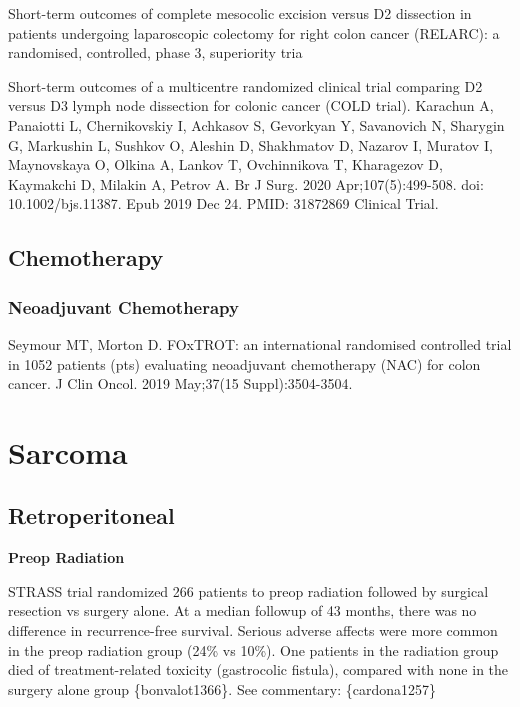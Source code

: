 \documentclass[
]{book}
\begin{document}
Short-term outcomes of complete mesocolic excision versus D2 dissection in patients undergoing laparoscopic colectomy for right colon cancer (RELARC): a randomised, controlled, phase 3, superiority tria

Short-term outcomes of a multicentre randomized clinical trial comparing D2 versus D3 lymph node dissection for colonic cancer (COLD trial).
Karachun A, Panaiotti L, Chernikovskiy I, Achkasov S, Gevorkyan Y, Savanovich N, Sharygin G, Markushin L, Sushkov O, Aleshin D, Shakhmatov D, Nazarov I, Muratov I, Maynovskaya O, Olkina A, Lankov T, Ovchinnikova T, Kharagezov D, Kaymakchi D, Milakin A, Petrov A.
Br J Surg. 2020 Apr;107(5):499-508. doi: 10.1002/bjs.11387. Epub 2019 Dec 24.
PMID: 31872869 Clinical Trial.

\hypertarget{chemotherapy}{%
\chapter{Chemotherapy}\label{chemotherapy}}

\hypertarget{neoadjuvant-chemotherapy}{%
\section{Neoadjuvant Chemotherapy}\label{neoadjuvant-chemotherapy}}

Seymour MT, Morton D. FOxTROT: an international randomised controlled trial in 1052 patients (pts) evaluating neoadjuvant chemotherapy (NAC) for colon cancer. J Clin Oncol. 2019 May;37(15 Suppl):3504-3504.

\hypertarget{part-sarcoma}{%
\part*{Sarcoma}\label{part-sarcoma}}

\hypertarget{retroperitoneal}{%
\chapter{Retroperitoneal}\label{retroperitoneal}}

\textbf{Preop Radiation}

STRASS trial randomized 266 patients to preop radiation followed by surgical resection vs surgery alone. At a median followup of 43 months, there was no difference in recurrence-free survival. Serious adverse affects were more common in the preop radiation group (24\% vs 10\%). One patients in the radiation group died of treatment-related toxicity (gastrocolic fistula), compared with none in the surgery alone group \{bonvalot1366\}. See commentary: \{cardona1257\}

  
\end{document}
